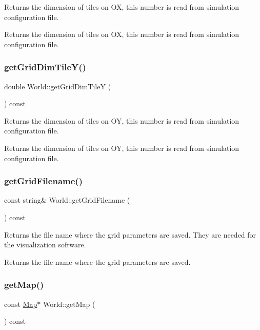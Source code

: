 Returns the dimension of tiles on OX, this number is read from simulation configuration file. \begin{DoxyReturn}{Returns}
the dimension of tiles on OX, this number is read from simulation configuration file. 
\end{DoxyReturn}
\mbox{\label{class_world_a99a004c6f3ce1a3a76894bb1f9625bbe}} 
\subsubsection{\texorpdfstring{get\+Grid\+Dim\+Tile\+Y()}{getGridDimTileY()}}
{\footnotesize\ttfamily double World\+::get\+Grid\+Dim\+TileY (\begin{DoxyParamCaption}{ }\end{DoxyParamCaption}) const}

Returns the dimension of tiles on OY, this number is read from simulation configuration file. \begin{DoxyReturn}{Returns}
the dimension of tiles on OY, this number is read from simulation configuration file. 
\end{DoxyReturn}
\mbox{\label{class_world_a7d07b06f9884185161c5cc34034a7212}} 
\subsubsection{\texorpdfstring{get\+Grid\+Filename()}{getGridFilename()}}
{\footnotesize\ttfamily const string\& World\+::get\+Grid\+Filename (\begin{DoxyParamCaption}{ }\end{DoxyParamCaption}) const}

Returns the file name where the grid parameters are saved. They are needed for the visualization software. \begin{DoxyReturn}{Returns}
the file name where the grid parameters are saved. 
\end{DoxyReturn}
\mbox{\label{class_world_a33b8543ee812ae4f8ff93329444da4cb}} 
\subsubsection{\texorpdfstring{get\+Map()}{getMap()}}
{\footnotesize\ttfamily const \hyperlink{class_map}{Map}$\ast$ World\+::get\+Map (\begin{DoxyParamCaption}{ }\end{DoxyParamCaption}) const}

